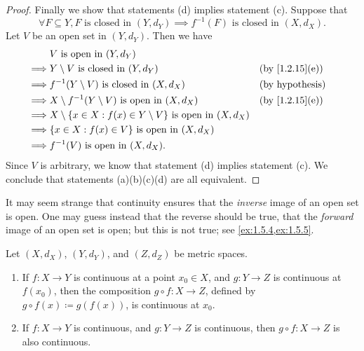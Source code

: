 \begin{proof}
  Finally we show that statements (d) implies statement (c).
  Suppose that
  \[
    \forall F \subseteq Y, F \text{ is closed in } (Y, d_Y) \implies f^{-1}(F) \text{ is closed in } (X, d_X).
  \]
  Let \(V\) be an open set in \((Y, d_Y)\).
  Then we have
  \begin{align*}
             & V \text{ is open in } (Y, d_Y)                                                                                    \\
    \implies & Y \setminus V \text{ is closed in } (Y, d_Y)                                    &  & \text{(by \cref{1.2.15}(e))} \\
    \implies & f^{-1}(Y \setminus V) \text{ is closed in } (X, d_X)                            &  & \text{(by hypothesis)}       \\
    \implies & X \setminus f^{-1}(Y \setminus V) \text{ is open in } (X, d_X)                  &  & \text{(by \cref{1.2.15}(e))} \\
    \implies & X \setminus \set{x \in X : f(x) \in Y \setminus V} \text{ is open in } (X, d_X)                                   \\
    \implies & \set{x \in X : f(x) \in V} \text{ is open in } (X, d_X)                                                           \\
    \implies & f^{-1}(V) \text{ is open in } (X, d_X).
  \end{align*}
  Since \(V\) is arbitrary, we know that statement (d) implies statement (c).
  We conclude that statements (a)(b)(c)(d) are all equivalent.
\end{proof}

\begin{rmk}\label{2.1.6}
  It may seem strange that continuity ensures that the \emph{inverse} image of an open set is open.
  One may guess instead that the reverse should be true, that the \emph{forward} image of an open set is open;
  but this is not true;
  see \cref{ex:1.5.4,ex:1.5.5}.
\end{rmk}

\begin{cor}\label{2.1.7}
  Let \((X, d_X)\), \((Y, d_Y)\), and \((Z, d_Z)\) be metric spaces.
  \begin{enumerate}
    \item If \(f : X \to Y\) is continuous at a point \(x_0 \in X\), and \(g : Y \to Z\) is continuous at \(f(x_0)\), then the composition \(g \circ f : X \to Z\), defined by \(g \circ f(x) \coloneqq g(f(x))\), is continuous at \(x_0\).
    \item If \(f : X \to Y\) is continuous, and \(g : Y \to Z\) is continuous, then \(g \circ f : X \to Z\) is also continuous.
  \end{enumerate}
\end{cor}

